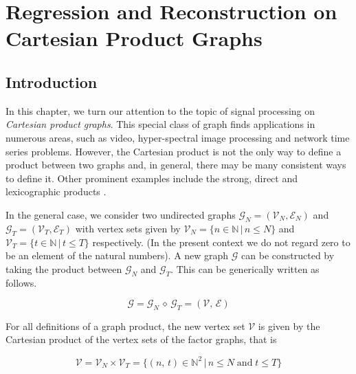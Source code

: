 \chapter{Regression and Reconstruction on Cartesian Product Graphs} 

\label{chap:reg_and_rec} 




\section{Introduction}

\label{sec:reg_and_rec_intro}

In this chapter, we turn our attention to the topic of signal processing on \textit{Cartesian product graphs}. This special class of graph finds applications in numerous areas, such as video, hyper-spectral image processing and network time series problems. However, the Cartesian product is not the only way to define a product between two graphs and, in general, there may be many consistent ways to define it. Other prominent examples include the strong, direct and lexicographic products \citep{Imrich2000}. 

In the general case, we consider two undirected graphs $\mathcal{G}_N = (\mathcal{V}_N, \mathcal{E}_N)$ and $\mathcal{G}_T = (\mathcal{V}_T, \mathcal{E}_T)$ with vertex sets given by $\mathcal{V}_N = \{n \in \mathbb{N} \, | \, n \leq N \}$ and $\mathcal{V}_T = \{t \in \mathbb{N} \, | \, t \leq T \}$ respectively. (In the present context we do not regard zero to be an element of the natural numbers). A new graph $\mathcal{G}$ can be constructed by taking the product between $\mathcal{G}_N$ and $\mathcal{G}_T$. This can be generically written as follows. 

\begin{equation}
    \mathcal{G} = \mathcal{G}_N \, \diamond \, \mathcal{G}_T = (\mathcal{V}, \, \mathcal{E})
\end{equation}

For all definitions of a graph product, the new vertex set $\mathcal{V}$ is given by the Cartesian product of the vertex sets of the factor graphs, that is

\begin{equation}
    \mathcal{V} = \mathcal{V}_N \times \mathcal{V}_T = \{(n, \, t) \in \mathbb{N}^2 \, | \, n \leq N \; \text{and} \; t \leq T \}
\end{equation}

